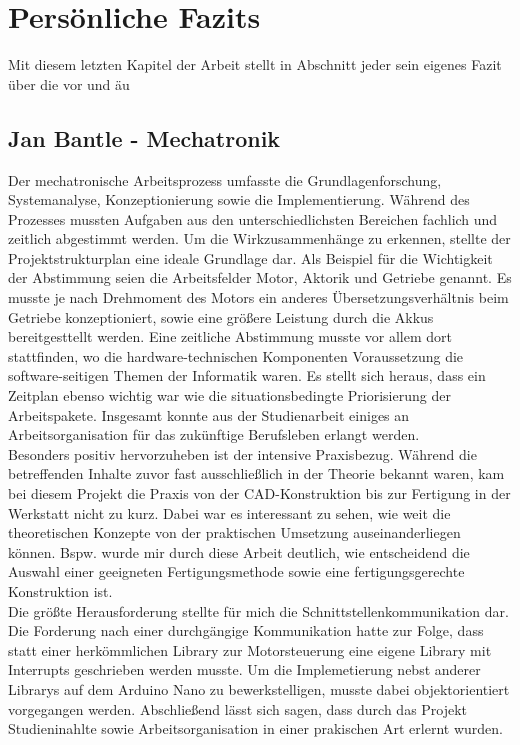 \section{Persönliche Fazits}
\label{sec:fazit}

Mit diesem letzten Kapitel der Arbeit stellt in Abschnitt  jeder sein eigenes Fazit über die vor und äu

\subsection{Jan Bantle - Mechatronik}

Der mechatronische Arbeitsprozess umfasste die Grundlagenforschung, Systemanalyse, Konzeptionierung sowie die Implementierung. Während des Prozesses mussten Aufgaben aus den unterschiedlichsten Bereichen fachlich und zeitlich abgestimmt werden. Um die Wirkzusammenhänge zu erkennen, stellte  der Projektstrukturplan eine ideale Grundlage dar. Als Beispiel für die Wichtigkeit der Abstimmung seien die Arbeitsfelder Motor, Aktorik und Getriebe genannt. Es musste je nach Drehmoment des Motors  ein anderes Übersetzungsverhältnis beim Getriebe konzeptioniert, sowie eine größere Leistung durch die Akkus bereitgesttellt werden. Eine zeitliche Abstimmung musste vor allem dort stattfinden, wo die hardware-technischen Komponenten Voraussetzung die software-seitigen Themen der Informatik waren. Es stellt sich heraus, dass ein Zeitplan ebenso wichtig war wie die situationsbedingte Priorisierung der Arbeitspakete. Insgesamt konnte aus der Studienarbeit einiges an Arbeitsorganisation für das zukünftige Berufsleben erlangt werden. \\


Besonders positiv hervorzuheben ist der intensive Praxisbezug. Während die betreffenden Inhalte zuvor fast ausschließlich in der Theorie bekannt waren, kam bei diesem Projekt die Praxis von der CAD-Konstruktion bis zur Fertigung in der Werkstatt nicht zu kurz. Dabei war es interessant zu sehen, wie weit die theoretischen Konzepte von der praktischen Umsetzung auseinanderliegen können. Bspw. wurde mir durch diese Arbeit deutlich, wie entscheidend die Auswahl einer geeigneten Fertigungsmethode sowie eine fertigungsgerechte Konstruktion ist.  \\

Die größte Herausforderung stellte für mich die Schnittstellenkommunikation dar. Die Forderung nach einer durchgängige Kommunikation hatte zur Folge, dass statt einer herkömmlichen Library zur Motorsteuerung eine eigene Library mit Interrupts geschrieben werden musste. Um die Implemetierung nebst anderer Librarys auf dem Arduino Nano zu bewerkstelligen, musste dabei objektorientiert vorgegangen werden. Abschließend lässt sich sagen, dass durch das Projekt Studieninahlte sowie Arbeitsorganisation in einer prakischen Art erlernt wurden.

